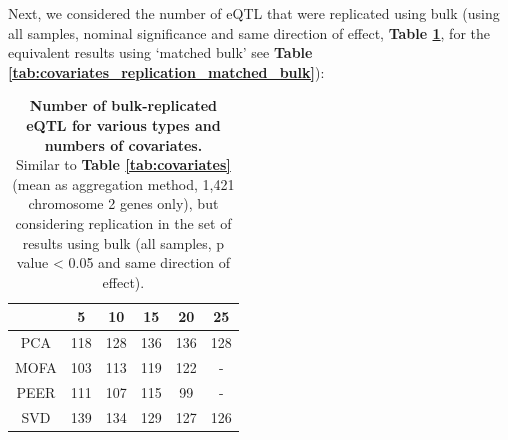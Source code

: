 
Next, we considered the number of eQTL that were replicated using bulk (using all samples, nominal significance and same direction of effect, \textbf{Table \ref{tab:covariates_replication}}, for the equivalent results using `matched bulk' see \textbf{Table \ref{tab:covariates_replication_matched_bulk}}):

\begin{table}[h]
    \centering
    \begin{tabular}{c|c c c c c}
    &         5 & 10 & 15 & 20 & 25  \\
    \hline
    PCA   & 118 & 128 & 136 & 136 & 128 \\
    MOFA  & 103 & 113 & 119 & 122 &  -  \\
    PEER  & 111 & 107 & 115 &  99 &  -  \\
    SVD   & 139 & 134 & 129 & 127 & 126 \\
    \end{tabular}
    \caption[Covariate comparison in terms of replication of bulk results]{\textbf{Number of bulk-replicated eQTL for various types and numbers of covariates.} \\
    Similar to \textbf{Table \ref{tab:covariates}} (mean as aggregation method, 1,421 chromosome 2 genes only), but considering replication in the set of results using bulk (all samples, p value < 0.05 and same direction of effect).}
    \label{tab:covariates_replication}
\end{table}

